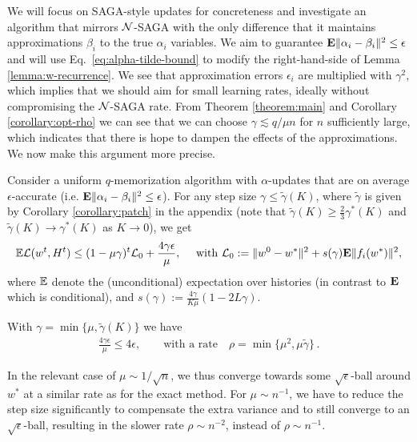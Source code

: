 We will focus on SAGA-style updates for concreteness and investigate an algorithm that mirrors ${\cal N}$-SAGA with the only difference that it maintains approximations $\beta_i$ to the true $\alpha_i$ variables. We aim to guarantee  ${\mathbf E}\| \alpha_i - \beta_i \|^2 \le \epsilon$ and will use Eq.~\eqref{eq:alpha-tilde-bound} to modify the right-hand-side of Lemma \ref{lemma:w-recurrence}. We see that approximation errors $\epsilon_i$ are multiplied with $\gamma^2$, which implies that we should aim for small learning rates, ideally without compromising the ${\cal N}$-SAGA rate. From Theorem \ref{theorem:main} and Corollary \ref{corollary:opt-rho} we can see that we can choose $\gamma \lesssim  q/{\mu n}$ for $n$ sufficiently large, which indicates that there is hope to dampen the effects of the approximations. We now make this argument more precise.
%
%
%
%
\begin{theorem}
\label{theorem:approximate}
Consider a uniform $q$-memorization algorithm with $\alpha$-updates that are on average $\epsilon$-accurate (i.e. ${\mathbf E}\| \alpha_i - \beta_i \|^2 \le \epsilon$). For any step size $\gamma \le \tilde{\gamma}(K)$, where $\tilde{\gamma}$ is given by Corollary \ref{corollary:patch} in the appendix (note that $\tilde{\gamma}(K) \geq \frac{2}{3} \gamma^*(K)$ and $\tilde{\gamma}(K) \to \gamma^*(K)$ as $K \to 0$), we get 
\begin{align}
\mathbb{E} {\mathcal L}(w^t,H^t) \le  (1-\mu \gamma)^t  {\mathcal L}_0+ \frac{4 \gamma \epsilon}{\mu}, \quad \text{ with } {\mathcal L}_0 := \|w^0 - w^*\|^2 + s(\gamma) {\mathbf E} \|f_i(w^*)\|^2 ,
\end{align}
where $\mathbb{E}$ denote the (unconditional) expectation over histories (in contrast to ${\mathbf E}$ which is conditional), and $ s(\gamma) := \frac{4 \gamma}{K \mu} (1-2 L \gamma)$.
%
%
%
%
%
%
%
%
%
%
\end{theorem} 
\begin{corollary}
With $\gamma = \min\{\mu , \tilde{\gamma}(K)\}$ we have 
\begin{align}
\frac {4 \gamma \epsilon }{\mu}  \le 4 \epsilon, \qquad 
\text{with a rate} \quad \rho = \min\{\mu^2, \mu \tilde{\gamma}\} \, .
\end{align}
\end{corollary} 
\vspace{-1.5mm}
In the relevant case of $\mu \sim 1/\sqrt {n}$, we thus converge towards some $\sqrt{\epsilon}$-ball around $w^*$ at a similar rate as for the exact method. For $\mu \sim n^{-1}$, we have to reduce the step size significantly to compensate the extra variance and to still converge to an $\sqrt{\epsilon}$-ball, resulting in the slower rate $\rho \sim n^{-2}$, instead of $\rho \sim n^{-1}$.

